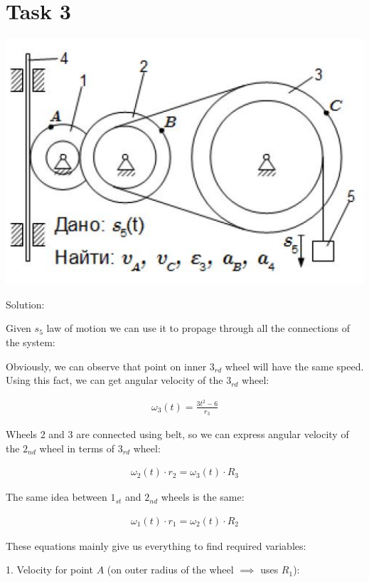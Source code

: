 \documentclass{article}
\begin{document}
\newpage

\section{Task 3}

\includegraphics[width=\textwidth]{fig3.png}

Solution:

Given $s_5$ law of motion we can use it to propage through all the connections of the system:

Obviously, we can observe that point on inner $3_{rd}$ wheel will have the same speed.
Using this fact, we can get angular velocity of the $3_{rd}$ wheel:

\begin{align}
    \omega_3(t) = \frac{3t^2 - 6}{r_3}
\end{align}

Wheels 2 and 3 are connected using belt, so we can express angular velocity of the $2_{nd}$ wheel in terms of $3_{rd}$ wheel:

\begin{align}
    \omega_2(t) \cdot r_2 = \omega_3(t) \cdot R_3
\end{align}

The same idea between $1_{st}$ and $2_{nd}$ wheels is the same:

\begin{align}
    \omega_1(t) \cdot r_1 = \omega_2(t) \cdot R_2
\end{align}

These equations mainly give us everything to find required variables:

1. Velocity for point $A$ (on outer radius of the wheel $\implies$ uses $R_1$):
\end{document}

